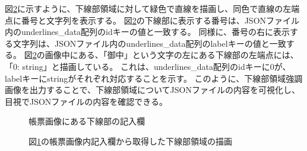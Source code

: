 図\ref{fig:underline_drawing}に示すように、下線部領域に対して緑色で直線を描画し、同色で直線の左端点に番号と文字列を表示する。
図\ref{fig:underline_drawing}の下線部に表示する番号は、JSONファイル内のunderlines\_data配列のidキーの値と一致する。
同様に、番号の右に表示する文字列は、JSONファイル内のunderlines\_data配列のlabelキーの値と一致する。
図\ref{fig:underline_drawing}の画像中にある、「御中」という文字の左にある下線部の左端点には、「0: string」と描画している。
これは、underlines\_data配列のidキーに0が、labelキーにstringがそれぞれ対応することを示す。
このように、下線部領域強調画像を出力することで、下線部領域についてJSONファイルの内容を可視化し、目視でJSONファイルの内容を確認できる。
\begin{figure}[tp]
    \begin{center}
        \caption{帳票画像にある下線部の記入欄}
        \label{fig:underline_original}
    \end{center}
\end{figure}
\begin{figure}[tp]
    \begin{center}
        \caption{図\ref{fig:underline_original}の帳票画像内記入欄から取得した下線部領域の描画}
        \label{fig:underline_drawing}
    \end{center}
\end{figure}